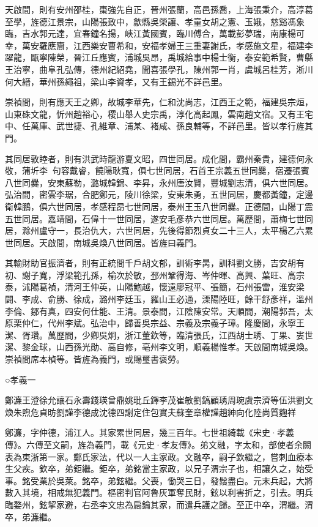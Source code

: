 \begin{pinyinscope}
天啟間，則有安州邵桂，棗強先自正，晉州張蘭，高邑孫喬，上海張秉介，高淳葛至學，旌德江景宗，山陽張致中，歙縣吳榮讓、孝童女胡之憲、玉娥，慈谿馮象臨，吉水郭元達，宜春鐘名揚，峽江黃國賓，臨川傅合，萬載彭夢瑞，南康楊可幸，萬安羅應齎，江西樂安曹希和，安福孝婦王三重妻謝氏，孝感施文星，福建李躍龍，甌寧陳榮，晉江丘應賓，浦城吳昂，禹城給事中楊士衡，泰安範希賢，曹縣王治寧，曲阜孔弘傳，德州紀紹堯，聞喜張學孔，陳州郭一肖，虞城呂桂芳，淅川何大縉，華州孫繩祖，梁山李資孝，又有王錫光不詳邑里。

崇禎間，則有應天王之卿，故城李華先，仁和沈尚志，江西王之範，福建吳宗烜，山東硃文龍，忻州趙裕心，稷山舉人史宗禹，淳化高起鳳，雲南趙文宿。又有王宅中、任萬庫、武世捷、孔維章、浦某、褚咸、孫良輔等，不詳邑里。皆以孝行旌其門。

其同居敦睦者，則有洪武時龍游夏文昭，四世同居。成化間，霸州秦貴，建德何永敬，蒲圻李，句容戴睿，饒陽耿寬，俱七世同居，石首王宗義五世同爨，宿遷張賓八世同爨，安東蘇勒，潞城韓錦、李昇，永州唐汝賢，豐城劉志清，俱六世同居。弘治間，密雲李琚，合肥鄭元，陵川徐梁，安東朱勇，五世同居，慶都黃鐘，定邊衛韓鵬，俱六世同居，孝感程昂七世同居，泰州王玉八世同爨。正德間，山陽丁震五世同居。嘉靖間，石偉十一世同居，遂安毛彥恭六世同居。萬歷間，蕭梅七世同居，滁州盧守一，長治仇大，六世同居，先後得節烈貞女二十三人，太平楊乙六累世同居。天啟間，南城吳煥八世同居。皆旌曰義門。

其輸財助官振濟者，則有正統間千戶胡文郁，訓術李昺，訓科劉文勝，吉安胡有初、謝子寬，浮梁範孔孫，榆次於敏，邳州鞏得海、岑仲暉、高興、葉旺、高宗泰，沭陽葛禎，清河王仲英，山陽鮑越，懷遠廖冠平、張簡，石州張雷，淮安梁闢、李成、俞勝、徐成，潞州李廷玉，羅山王必通，溧陽陸旺，餘干舒彥祥，溫州李倫、鄒有真，四安何仕能、王清。景泰間，江陰陳安常。天順間，潮陽郭吾，太原栗仲仁，代州李斌。弘治中，歸善吳宗益、宗義及宗義子璋。隆慶間，永寧王潔、胥瓚。萬歷間，少卿吳炯，浙江董欽等，臨清張氏，江西胡士琇、丁果、婁世潔、黎金球，山西孫光勛、高自修，亳州李文明，順義楊惟孝。天啟間南城吳煥。崇禎間席本楨等。皆旌為義門，或賜璽書褒勞。

○孝義一

鄭濂王澄徐允讓石永壽錢瑛曾鼎姚玭丘鐸李茂崔敏劉鎬顧琇周琬虞宗濟等伍洪劉文煥朱煦危貞昉劉謹李德成沈德四謝定住包實夫蘇奎章權謹趙紳向化陸尚質麴祥

鄭濂，字仲德，浦江人。其家累世同居，幾三百年。七世祖綺載《宋史·孝義傳》。六傳至文嗣，旌為義門，載《元史·孝友傳》。弟文融，字太和，部使者余闕表為東浙第一家。鄭氏家法，代以一人主家政。文融卒，嗣子欽繼之，嘗刺血療本生父疾。欽卒，弟鉅繼。鉅卒，弟銘當主家政，以兄子渭宗子也，相讓久之，始受事。銘受業於吳萊。銘卒，弟鉉繼。父喪，慟哭三日，發鬚盡白。元末兵起，大將數入其境，相戒無犯義門。樞密判官阿魯灰軍奪民財，鉉以利害折之，引去。明兵臨婺州，鉉挈家避，右丞李文忠為扃鑰其家，而遣兵護之歸。至正中卒，渭繼。渭卒，弟濂繼。


\end{pinyinscope}
